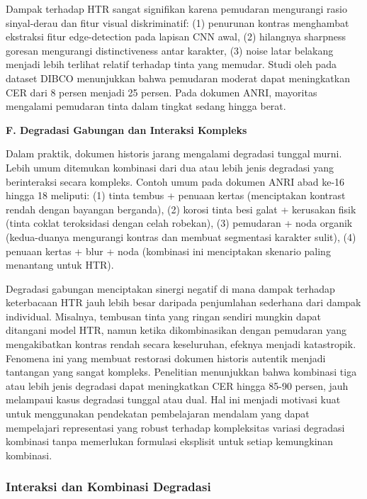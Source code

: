 Dampak terhadap HTR sangat signifikan karena pemudaran mengurangi rasio sinyal-derau dan fitur visual diskriminatif: (1) penurunan kontras menghambat ekstraksi fitur edge-detection pada lapisan CNN awal, (2) hilangnya sharpness goresan mengurangi distinctiveness antar karakter, (3) noise latar belakang menjadi lebih terlihat relatif terhadap tinta yang memudar. Studi oleh \citep{pratikakis2013} pada dataset DIBCO menunjukkan bahwa pemudaran moderat dapat meningkatkan CER dari 8 persen menjadi 25 persen. Pada dokumen ANRI, mayoritas mengalami pemudaran tinta dalam tingkat sedang hingga berat.

\vspace{0.5ex}
\noindent\textbf{F. Degradasi Gabungan dan Interaksi Kompleks}

Dalam praktik, dokumen historis jarang mengalami degradasi tunggal murni. Lebih umum ditemukan kombinasi dari dua atau lebih jenis degradasi yang berinteraksi secara kompleks. Contoh umum pada dokumen ANRI abad ke-16 hingga 18 meliputi: (1) tinta tembus + penuaan kertas (menciptakan kontrast rendah dengan bayangan berganda), (2) korosi tinta besi galat + kerusakan fisik (tinta coklat teroksidasi dengan celah robekan), (3) pemudaran + noda organik (kedua-duanya mengurangi kontras dan membuat segmentasi karakter sulit), (4) penuaan kertas + blur + noda (kombinasi ini menciptakan skenario paling menantang untuk HTR).

Degradasi gabungan menciptakan sinergi negatif di mana dampak terhadap keterbacaan HTR jauh lebih besar daripada penjumlahan sederhana dari dampak individual. Misalnya, tembusan tinta yang ringan sendiri mungkin dapat ditangani model HTR, namun ketika dikombinasikan dengan pemudaran yang mengakibatkan kontras rendah secara keseluruhan, efeknya menjadi katastropik. Fenomena ini yang membuat restorasi dokumen historis autentik menjadi tantangan yang sangat kompleks. Penelitian \citep{textdiae2022} menunjukkan bahwa kombinasi tiga atau lebih jenis degradasi dapat meningkatkan CER hingga 85-90 persen, jauh melampaui kasus degradasi tunggal atau dual. Hal ini menjadi motivasi kuat untuk menggunakan pendekatan pembelajaran mendalam yang dapat mempelajari representasi yang robust terhadap kompleksitas variasi degradasi kombinasi tanpa memerlukan formulasi eksplisit untuk setiap kemungkinan kombinasi.

\subsubsection{Interaksi dan Kombinasi Degradasi}
\label{subsubsec:interaksi-degradasi}

